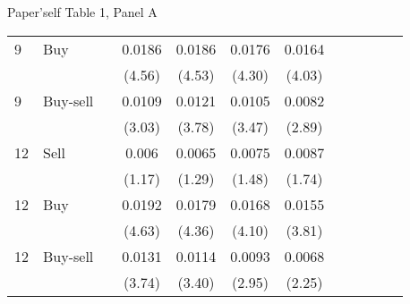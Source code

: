 \documentclass{beamer}
\begin{document}
\begin{frame}{Paper'self Table 1, Panel A}
\begin{table}
\begin{tabular}{llrSSSScSSSS}
			9  & Buy      &    & 0.0186                & 0.0186                & 0.0176                & 0.0164                 \\
			   &          &    & (4.56)                & (4.53)                & (4.30)                & (4.03)                 \\
			9  & Buy-sell &    & 0.0109                & 0.0121                & 0.0105                & 0.0082                 \\
			   &          &    & (3.03)                & (3.78)                & (3.47)                & (2.89)                 \\
			12 & Sell     &    & 0.006                 & 0.0065                & 0.0075                & 0.0087                 \\
			   &          &    & (1.17)                & (1.29)                & (1.48)                & (1.74)                 \\
			12 & Buy      &    & 0.0192                & 0.0179                & 0.0168                & 0.0155                 \\
			   &          &    & (4.63)                & (4.36)                & (4.10)                & (3.81)                 \\
			12 & Buy-sell &    & 0.0131                & 0.0114                & 0.0093                & 0.0068                 \\
			   &          &    & (3.74)                & (3.40)                & (2.95)                & (2.25)                 \\
			\bottomrule
		\end{tabular}
	\end{table}
\end{frame}
\end{document}

